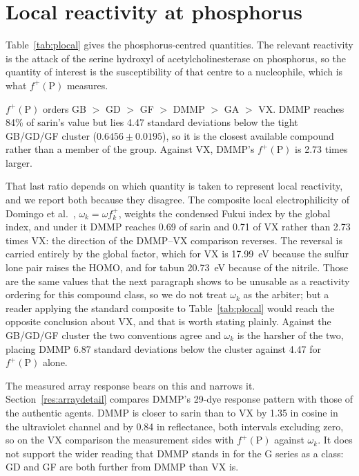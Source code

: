 \documentclass[journal=jacsat,manuscript=suppinfo,margin=1in]{achemso}
\begin{document}
\section{Local reactivity at phosphorus}
\label{res:plocal}

Table~\ref{tab:plocal} gives the phosphorus-centred quantities. The relevant
reactivity is the attack of the serine hydroxyl of acetylcholinesterase on
phosphorus, so the quantity of interest is the susceptibility of that centre to
a nucleophile, which is what $f^{+}(\mathrm{P})$ measures.

$f^{+}(\mathrm{P})$ orders GB $>$ GD $>$ GF $>$ DMMP $>$ GA $>$ VX. DMMP reaches
84\% of sarin's value but lies 4.47 standard deviations below the tight GB/GD/GF
cluster ($0.6456 \pm 0.0195$), so it is the closest available compound rather
than a member of the group. Against VX, DMMP's $f^{+}(\mathrm{P})$ is 2.73 times
larger.

That last ratio depends on which quantity is taken to represent local
reactivity, and we report both because they disagree. The composite local
electrophilicity of Domingo et al.~\cite{domingo2016},
$\omega_k = \omega f^{+}_k$, weights the condensed Fukui index by the global
index, and under it DMMP reaches 0.69 of sarin and 0.71 of VX rather than 2.73
times VX: the direction of the DMMP--VX comparison reverses. The reversal is
carried entirely by the global factor, which for VX is 17.99~eV because the
sulfur lone pair raises the HOMO, and for tabun 20.73~eV because of the nitrile.
Those are the same values that the next paragraph shows to be unusable as a
reactivity ordering for this compound class, so we do not treat $\omega_k$ as
the arbiter; but a reader applying the standard composite to Table~\ref{tab:plocal}
would reach the opposite conclusion about VX, and that is worth stating plainly.
Against the GB/GD/GF cluster the two conventions agree and $\omega_k$ is the
harsher of the two, placing DMMP 6.87 standard deviations below the cluster
against 4.47 for $f^{+}(\mathrm{P})$ alone.

The measured array response bears on this and narrows it.
Section~\ref{res:arraydetail} compares DMMP's 29-dye response pattern with those of
the authentic agents. DMMP is closer to sarin than to VX by 1.35 in cosine in
the ultraviolet channel and by 0.84 in reflectance, both intervals excluding
zero, so on the VX comparison the measurement sides with $f^{+}(\mathrm{P})$
against $\omega_k$. It does not support the wider reading that DMMP stands in
for the G series as a class: GD and GF are both further from DMMP than VX is.
\end{document}

